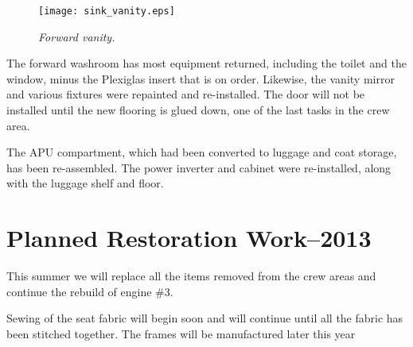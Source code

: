 \begin{figure}[htbp]
   \vspace{2em}
   \centering
   \texttt{[image: sink\_vanity.eps]}
   \caption*{\small \em Forward vanity.}
   \label{fig:vanity}
\end{figure}

The forward washroom has most equipment returned, including the toilet
and the window, minus the Plexiglas insert that is on order.
Likewise, the vanity mirror and various fixtures were repainted and
re-installed.  The door will not be installed until the new flooring
is glued down, one of the last tasks in the crew area.

The APU compartment, which had been converted to luggage and coat
storage, has been re-assembled.  The power inverter and cabinet were
re-installed, along with the luggage shelf and floor.




\section{Planned Restoration Work--2013}
\label{sec:plannedwork}

This summer we will replace all the items removed from the crew areas
and continue the rebuild of engine \#3.

Sewing of the seat fabric will begin soon and will continue until all
the fabric has been stitched together.  The frames will be
manufactured later this year

